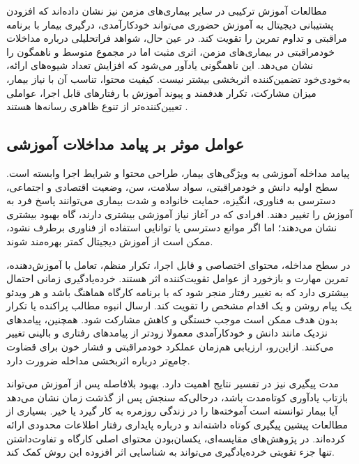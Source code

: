 \par
مطالعات آموزش ترکیبی در سایر بیماری‌های مزمن نیز نشان داده‌اند که افزودن پشتیبانی دیجیتال به آموزش حضوری می‌تواند خودکارآمدی، درگیری بیمار با برنامه مراقبتی و تداوم تمرین را تقویت کند. در عین حال، شواهد فراتحلیلی درباره مداخلات خودمراقبتی در بیماری‌های مزمن، اثری مثبت اما در مجموع متوسط و ناهمگون را نشان می‌دهد. این ناهمگونی یادآور می‌شود که افزایش تعداد شیوه‌های ارائه، به‌خودی‌خود تضمین‌کننده اثربخشی بیشتر نیست. کیفیت محتوا، تناسب آن با نیاز بیمار، میزان مشارکت، تکرار هدفمند و پیوند آموزش با رفتارهای قابل اجرا، عواملی تعیین‌کننده‌تر از تنوع ظاهری رسانه‌ها هستند \cite{munro2018blended,jennatfereidooni2026orem,lee2022chronicmeta}.

\subsection{عوامل موثر بر پیامد مداخلات آموزشی}
پیامد مداخله آموزشی به ویژگی‌های بیمار، طراحی محتوا و شرایط اجرا وابسته است. سطح اولیه دانش و خودمراقبتی، سواد سلامت، سن، وضعیت اقتصادی و اجتماعی، دسترسی به فناوری، انگیزه، حمایت خانواده و شدت بیماری می‌توانند پاسخ فرد به آموزش را تغییر دهند. افرادی که در آغاز نیاز آموزشی بیشتری دارند، گاه بهبود بیشتری نشان می‌دهند؛ اما اگر موانع دسترسی یا توانایی استفاده از فناوری برطرف نشود، ممکن است از آموزش دیجیتال کمتر بهره‌مند شوند.
\par
در سطح مداخله، محتوای اختصاصی و قابل اجرا، تکرار منظم، تعامل با آموزش‌دهنده، تمرین مهارت و بازخورد از عوامل تقویت‌کننده اثر هستند. خرده‌یادگیری زمانی احتمال بیشتری دارد که به تغییر رفتار منجر شود که با برنامه کارگاه هماهنگ باشد و هر ویدئو یک پیام روشن و یک اقدام مشخص را تقویت کند. ارسال انبوه مطالب پراکنده یا تکرار بدون هدف ممکن است موجب خستگی و کاهش مشارکت شود. همچنین، پیامدهای نزدیک مانند دانش و خودکارآمدی معمولا زودتر از پیامدهای رفتاری و بالینی تغییر می‌کنند. ازاین‌رو، ارزیابی هم‌زمان عملکرد خودمراقبتی و فشار خون برای قضاوت جامع‌تر درباره اثربخشی مداخله ضرورت دارد.
\par
مدت پیگیری نیز در تفسیر نتایج اهمیت دارد. بهبود بلافاصله پس از آموزش می‌تواند بازتاب یادآوری کوتاه‌مدت باشد، درحالی‌که سنجش پس از گذشت زمان نشان می‌دهد آیا بیمار توانسته است آموخته‌ها را در زندگی روزمره به کار گیرد یا خیر. بسیاری از مطالعات پیشین پیگیری کوتاه داشته‌اند و درباره پایداری رفتار اطلاعات محدودی ارائه کرده‌اند. در پژوهش‌های مقایسه‌ای، یکسان‌بودن محتوای اصلی کارگاه و تفاوت‌داشتن تنها جزء تقویتی خرده‌یادگیری می‌تواند به شناسایی اثر افزوده این روش کمک کند.

